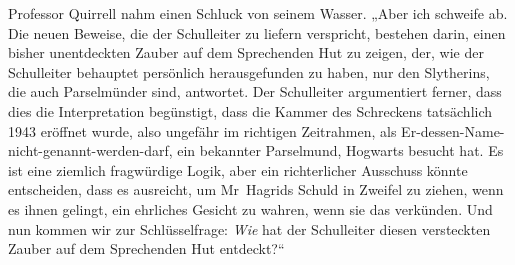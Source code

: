 Professor Quirrell nahm einen Schluck von seinem Wasser. „Aber ich schweife ab. Die neuen Beweise, die der Schulleiter zu liefern verspricht, bestehen darin, einen bisher unentdeckten Zauber auf dem Sprechenden Hut zu zeigen, der, wie der Schulleiter behauptet persönlich herausgefunden zu haben, nur den Slytherins, die auch Parselmünder sind, antwortet. Der Schulleiter argumentiert ferner, dass dies die Interpretation begünstigt, dass die Kammer des Schreckens tatsächlich 1943 eröffnet wurde, also ungefähr im richtigen Zeitrahmen, als Er-dessen-Name-nicht-genannt-werden-darf, ein bekannter Parselmund, Hogwarts besucht hat. Es ist eine ziemlich fragwürdige Logik, aber ein richterlicher Ausschuss könnte entscheiden, dass es ausreicht, um Mr~Hagrids Schuld in Zweifel zu ziehen, wenn es ihnen gelingt, ein ehrliches Gesicht zu wahren, wenn sie das verkünden. Und nun kommen wir zur Schlüsselfrage: \emph{Wie} hat der Schulleiter diesen versteckten Zauber auf dem Sprechenden Hut entdeckt?“

